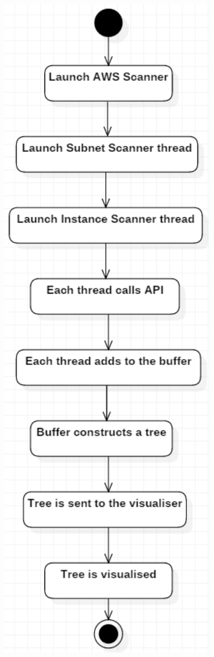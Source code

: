 \documentclass[a4paper,12pt]{report}
\begin{document}
\begin{itemize}
\begin{center}
			 	\includegraphics[width=1\textwidth] {./Diagrams/ScanRegionSequence.png}\\[0.4cm]

\end{center}
\end{itemize}
\end{document}
